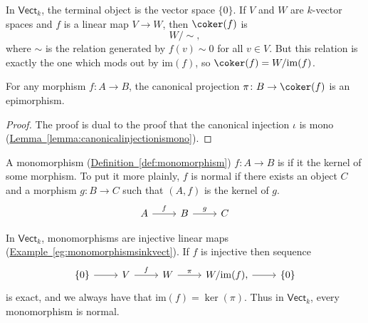 \documentclass[main.tex]{subfiles}
\begin{document}
\begin{example}
  \label{eg:invectcokernelsarequotientsbyimage}
  In $\mathsf{Vect}_{k}$, the terminal object is the vector space $\{0\}$. If $V$ and $W$ are $k$-vector spaces and $f$ is a linear map $V \to W$, then $\coker(f)$ is
  \begin{equation*}
    W / \sim,
  \end{equation*}
  where $\sim$ is the relation generated by $f(v) \sim 0$ for all $v \in V$. But this relation is exactly the one which mods out by $\mathrm{im}(f)$, so $\coker(f) = W / \mathrm{im}(f)$.
\end{example}

\begin{lemma}
  \label{lemma:canonicalsurjectionisepi}
  For any morphism $f\colon A \to B$, the canonical projection $\pi\colon B \to \coker(f)$ is an epimorphism.
\end{lemma}
\begin{proof}
  The proof is dual to the proof that the canonical injection $\iota$ is mono (\hyperref[lemma:canonicalinjectionismono]{Lemma~\ref*{lemma:canonicalinjectionismono}}).
\end{proof}

\begin{definition}
  \label{def:normalmonomorphism}
  A monomorphism (\hyperref[def:monomorphism]{Definition~\ref*{def:monomorphism}}) $f\colon A \to B$ is  if it the kernel of some morphism. To put it more plainly, $f$ is normal if there exists an object $C$ and a morphism $g\colon B \to C$ such that $(A, f)$ is the kernel of $g$.
  \begin{equation*}
    \begin{tikzcd}
      A \arrow[r, "f"] & B \arrow[r, "g"] & C
    \end{tikzcd}
  \end{equation*}
\end{definition}

\begin{example}
  In $\mathsf{Vect}_{k}$, monomorphisms are injective linear maps (\hyperref[eg:monomorphismsinkvect]{Example~\ref*{eg:monomorphismsinkvect}}). If $f$ is injective then sequence
  \begin{equation*}
    \begin{tikzcd}
      \{0\} \arrow[r] & V \arrow[r, "f"] & W \arrow[r, "\pi"] & W/\mathrm{im}(f) \arrow[r], & \{0\}
    \end{tikzcd}
  \end{equation*}
  is exact, and we always have that $\mathrm{im}(f) = \ker(\pi)$. Thus in $\mathsf{Vect}_{k}$, every monomorphism is normal.
\end{example}
\end{document}
